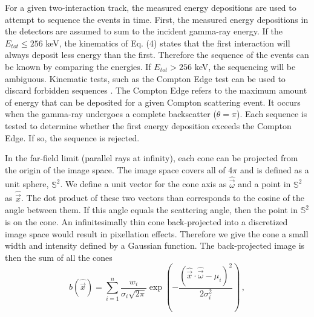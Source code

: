 \documentclass[10pt]{article}
\begin{document}
For a given two-interaction track, the measured energy depositions are used to attempt to sequence the events in time. First, the measured energy depositions in the detectors are assumed to sum to the incident gamma-ray energy. If the $E_{tot} \leq 256$ keV, the kinematics of Eq. (4) states that the first interaction will always deposit less energy than the first. Therefore the sequence of the events can be known by comparing the energies. If $E_{tot} > 256$ keV, the sequencing will be ambiguous. Kinematic tests, such as the Compton Edge test can be used to discard forbidden sequences \cite{Lehner2004}. The Compton Edge refers to the maximum amount of energy that can be deposited for a given Compton scattering event. It occurs when the gamma-ray undergoes a complete backscatter ($\theta = \pi$). Each sequence is tested to determine whether the first energy deposition exceeds the Compton Edge. If so, the sequence is rejected. 

In the far-field limit (parallel rays at infinity), each cone can be projected from the origin of the image space. The image space covers all of 4$\pi$ and is defined as a unit sphere, $\mathbb{S}^2$. We define a unit vector for the cone axis as $\hat{\vec{\omega}}$ and a point in $\mathbb{S}^2$ as $\hat{\vec{x}}$. The dot product of these two vectors than corresponds to the cosine of the angle between them. If this angle equals the scattering angle, then the point in $\mathbb{S}^2$ is on the cone. An infinitesimally thin cone back-projected into a discretized image space would result in pixellation effects. Therefore we give the cone a small width and intensity defined by a Gaussian function. The back-projected image is then the sum of all the cones
%
\begin{equation}
b(\hat{\vec{x}}) = \sum_{i=1}^n \frac{w_i}{\sigma_i \sqrt{2\pi}} \exp\left( -\frac{(\hat{\vec{x}} \cdot \hat{\vec{\omega}} - \mu_i)^2}{2\sigma_i^2} \right)\,,
\end{equation}
\end{document}
